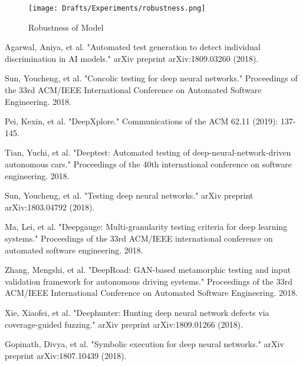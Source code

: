 \documentclass{article}
\begin{document}
\begin{figure*}[ht]
\centering
\texttt{[image: Drafts/Experiments/robustness.png]}
\caption{Robustness of Model}
\label{}
\end{figure*}






\begin{thebibliography}{01}

 Agarwal, Aniya, et al. "Automated test generation to detect individual discrimination in AI models." arXiv preprint arXiv:1809.03260 (2018).

 Sun, Youcheng, et al. "Concolic testing for deep neural networks." Proceedings of the 33rd ACM/IEEE International Conference on Automated Software Engineering. 2018.

 Pei, Kexin, et al. "DeepXplore." Communications of the ACM 62.11 (2019): 137-145.

 Tian, Yuchi, et al. "Deeptest: Automated testing of deep-neural-network-driven autonomous cars." Proceedings of the 40th international conference on software engineering. 2018.

 Sun, Youcheng, et al. "Testing deep neural networks." arXiv preprint arXiv:1803.04792 (2018).

 Ma, Lei, et al. "Deepgauge: Multi-granularity testing criteria for deep learning systems." Proceedings of the 33rd ACM/IEEE international conference on automated software engineering. 2018.

 Zhang, Mengshi, et al. "DeepRoad: GAN-based metamorphic testing and input validation framework for autonomous driving systems." Proceedings of the 33rd ACM/IEEE International Conference on Automated Software Engineering. 2018.

 Xie, Xiaofei, et al. "Deephunter: Hunting deep neural network defects via coverage-guided fuzzing." arXiv preprint arXiv:1809.01266 (2018).

	Gopinath, Divya, et al. "Symbolic execution for deep neural networks." arXiv preprint arXiv:1807.10439 (2018).


\end{thebibliography}
\end{document}
